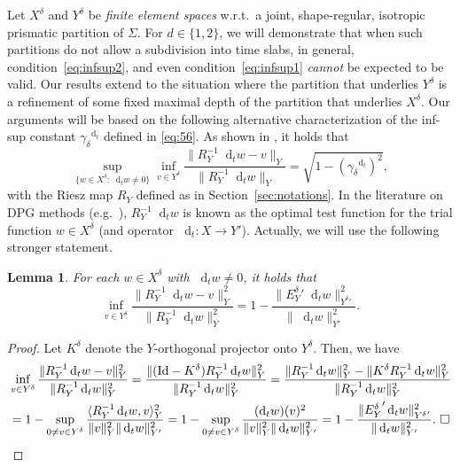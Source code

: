 \documentclass{amsart}
\newtheorem{lemma}[theorem]{Lemma}
\numberwithin{equation}{section}
\newcommand{\identity}{\mathrm{Id}}
\newcommand{\1}{\mathbb 1}
\newcommand*\diff{\mathop{}\!\mathrm{d}}
\newcommand{\be}{\begin{equation}}
\newcommand{\ee}{\end{equation}}
\begin{document}
Let $X^\delta$ and $Y^\delta$ be \emph{finite element spaces} w.r.t.~a joint, shape-regular, isotropic prismatic partition of $\Sigma$.
For $d \in \{1,2\}$, we will demonstrate that when such partitions do not allow a subdivision into time slabs, in general, condition~\eqref{eq:infsup2}, and even condition~\eqref{eq:infsup1} \emph{cannot} be expected to be valid.
Our results extend to the situation where the partition that underlies $Y^\delta$ is a refinement of some fixed maximal depth of the partition that underlies $X^\delta$.
Our arguments will be based on the following alternative characterization of the inf-sup constant $\gamma_\delta^{\diff_t}$ defined in \eqref{eq:56}.
As shown in \cite[Prop.~2.5]{35.8565}, it holds that
\be \label{eq:59}
\sup_{\{w\in X^\delta\colon \diff_t w \neq 0\}} \inf_{v \in Y^\delta} \frac{\|R_Y^{-1}\diff_t w  -v\|_Y}{\|R_Y^{-1}\diff_t w\|_Y}=\sqrt{1-(\gamma_\delta^{\diff_t})^2},
\ee
with the Riesz map $R_Y$ defined as in Section~\ref{sec:notations}.
In the literature on DPG methods (e.g.~\cite{64.14}), $R_Y^{-1}\diff_t w$ is known as the optimal test function for the trial function $w \in X^\delta$  (and operator $\diff_t\colon X \rightarrow Y'$). 
Actually, we will use the following stronger statement.
\begin{lemma}
For \emph{each} $w\in X^\delta$ with $\diff_t  w \neq 0$, it holds that
\be \label{eq:92}
\inf_{v \in Y^\delta} \frac{\|R_Y^{-1}\diff_t  w  -v\|^2_Y}{\|R_Y^{-1}\diff_t  w\|^2_Y}=1-\frac{\|{E_Y^\delta}'\diff_t  w\|_{{Y^\delta}'}^2}{\|\diff_t  w\|_{Y'}^2}.
\ee
\end{lemma}
\begin{proof}
Let  $K^\delta$ denote the $Y$-orthogonal projector onto $Y^\delta$. Then, we have
\begin{align*}
&\inf_{v \in Y^\delta} \frac{\|R_Y^{-1}\diff_t  w  -v\|^2_Y}{\|R_Y^{-1}\diff_t  w\|^2_Y}=
\frac{\|(\identity -K^\delta)R_Y^{-1}\diff_t  w \|^2_Y}{\|R_Y^{-1}\diff_t  w\|^2_Y}=
\frac{\|R_Y^{-1}\diff_t  w \|^2_Y-\|K^\delta R_Y^{-1}\diff_t  w\|^2_Y}{\|R_Y^{-1}\diff_t  w\|^2_Y}\\
&=1-\sup_{0 \neq v \in Y^\delta} \frac{\langle R_Y^{-1}\diff_t  w,v\rangle_Y^2}{\|v\|^2_Y \|\diff_t  w\|^2_{Y'}}=
1-\sup_{0 \neq v \in Y^\delta} \frac{(\diff_t  w)(v)^2}{\|v\|^2_Y \|\diff_t  w\|^2_{Y'}}=
1-\frac{\|{E_Y^\delta}'\diff_t  w\|^2_{{Y^\delta}'}}{\|\diff_t  w\|^2_{Y'}}.\,\,\Box\mbox{$\qedhere$}
\end{align*}
\end{proof}
\end{document}
